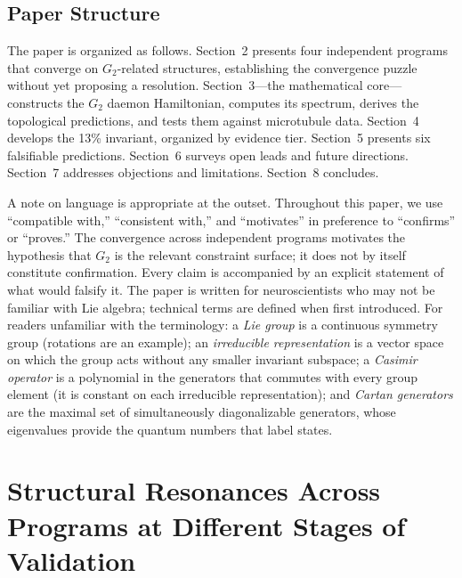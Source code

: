 \documentclass[12pt,a4paper]{article}
\begin{document}
\subsection{Paper Structure}

The paper is organized as follows. Section~2 presents four independent programs that converge on $G_2$-related structures, establishing the convergence puzzle without yet proposing a resolution. Section~3---the mathematical core---constructs the $G_2$ daemon Hamiltonian, computes its spectrum, derives the topological predictions, and tests them against microtubule data. Section~4 develops the 13\% invariant, organized by evidence tier. Section~5 presents six falsifiable predictions. Section~6 surveys open leads and future directions. Section~7 addresses objections and limitations. Section~8 concludes.

A note on language is appropriate at the outset. Throughout this paper, we use ``compatible with,'' ``consistent with,'' and ``motivates'' in preference to ``confirms'' or ``proves.'' The convergence across independent programs motivates the hypothesis that $G_2$ is the relevant constraint surface; it does not by itself constitute confirmation. Every claim is accompanied by an explicit statement of what would falsify it. The paper is written for neuroscientists who may not be familiar with Lie algebra; technical terms are defined when first introduced. For readers unfamiliar with the terminology: a \emph{Lie group} is a continuous symmetry group (rotations are an example); an \emph{irreducible representation} is a vector space on which the group acts without any smaller invariant subspace; a \emph{Casimir operator} is a polynomial in the generators that commutes with every group element (it is constant on each irreducible representation); and \emph{Cartan generators} are the maximal set of simultaneously diagonalizable generators, whose eigenvalues provide the quantum numbers that label states.

\section{Structural Resonances Across Programs at Different Stages of Validation}
\end{document}
